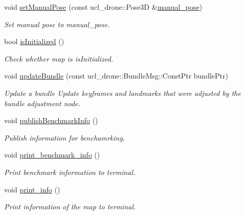 \begin{DoxyCompactItemize}
void \hyperlink{classMap_ab5b44206f7045aa6cd18cfb120d15865}{set\+Manual\+Pose} (const ucl\+\_\+drone\+::\+Pose3D \&\hyperlink{classMap_a08c5f5b93d3b296eab01d0f0702822ae}{manual\+\_\+pose})
\begin{DoxyCompactList}\small\item\em Set manual pose to manual\+\_\+pose. \end{DoxyCompactList}\item 
bool \hyperlink{classMap_ad6cda6f3731694cede731fa8fa05155e}{is\+Initialized} ()
\begin{DoxyCompactList}\small\item\em Check whether map is is\+Initialized. \end{DoxyCompactList}\item 
void \hyperlink{classMap_aefd9f26662bca1cf8e2963def923f558}{update\+Bundle} (const ucl\+\_\+drone\+::\+Bundle\+Msg\+::\+Const\+Ptr bundle\+Ptr)
\begin{DoxyCompactList}\small\item\em Update a bundle Update keyframes and landmarks that were adjusted by the bundle adjustment node. \end{DoxyCompactList}\item 
\mbox{\label{classMap_ad486aa15dfc0a826c69badf9a80b2954}} 
void \hyperlink{classMap_ad486aa15dfc0a826c69badf9a80b2954}{publish\+Benchmark\+Info} ()
\begin{DoxyCompactList}\small\item\em Publish information for benchamrking. \end{DoxyCompactList}\item 
\mbox{\label{classMap_a21406c7b75af70f36ddae1885d148302}} 
void \hyperlink{classMap_a21406c7b75af70f36ddae1885d148302}{print\+\_\+benchmark\+\_\+info} ()
\begin{DoxyCompactList}\small\item\em Print benchmark information to terminal. \end{DoxyCompactList}\item 
\mbox{\label{classMap_a8ab4414eb7329e247bd079ec1b5bdeba}} 
void \hyperlink{classMap_a8ab4414eb7329e247bd079ec1b5bdeba}{print\+\_\+info} ()
\begin{DoxyCompactList}\small\item\em Print information of the map to terminal. \end{DoxyCompactList}\item 

\end{DoxyCompactItemize}
